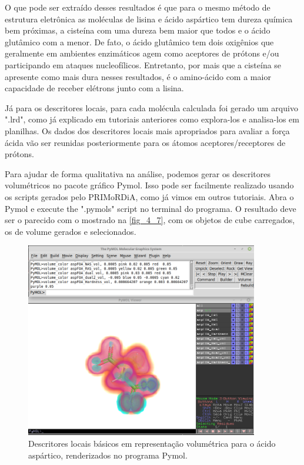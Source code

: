 \documentclass[a4paper,11pt]{refart}
\begin{document}
O que pode ser extraído desses resultados é que para o mesmo método de estrutura eletrônica as moléculas de lisina e ácido aspártico tem dureza química bem próximas, a cisteína com uma dureza bem maior que todos e o ácido glutâmico com a menor. De fato, o ácido glutâmico tem dois oxigênios que geralmente em ambientes enzimáticos agem como aceptores de prótons e/ou participando em ataques nucleofílicos. Entretanto, por mais que a cisteína se apresente como mais dura nesses resultados, é o amino-ácido com a maior capacidade de receber elétrons junto com a lisina. 

Já para os descritores locais, para cada molécula calculada foi gerado um arquivo ".lrd", como já explicado em tutoriais anteriores como explora-los e analisa-los em planilhas. Os dados dos descritores locais mais apropriados para avaliar a força ácida vão ser reunidas posteriormente para os átomos aceptores/receptores de prótons. 

Para ajudar de forma qualitativa na análise, podemos gerar os descritores volumétricos no pacote gráfico Pymol. Isso pode ser facilmente realizado usando os scripts gerados pelo PRIMoRDiA, como já vimos em outros tutoriais. Abra o Pymol e execute the ".pymols" script no terminal do programa. O resultado deve ser o parecido com o mostrado na \autoref{fig_4_7}, com os objetos de cube carregados, os de volume gerados e selecionados.


\hspace*{-\leftmarginwidth}
\begin{minipage}{\fullwidth}
	\begin{figure}[H]
		\begin{center}
			\includegraphics[width=4in]{images/tut4_img9}
			\caption{Descritores locais básicos em representação volumétrica para o ácido aspártico, renderizados no programa Pymol.}
			\label{fig_tut4_7}
		\end{center}
	\end{figure}
\end{minipage}
\end{document}
